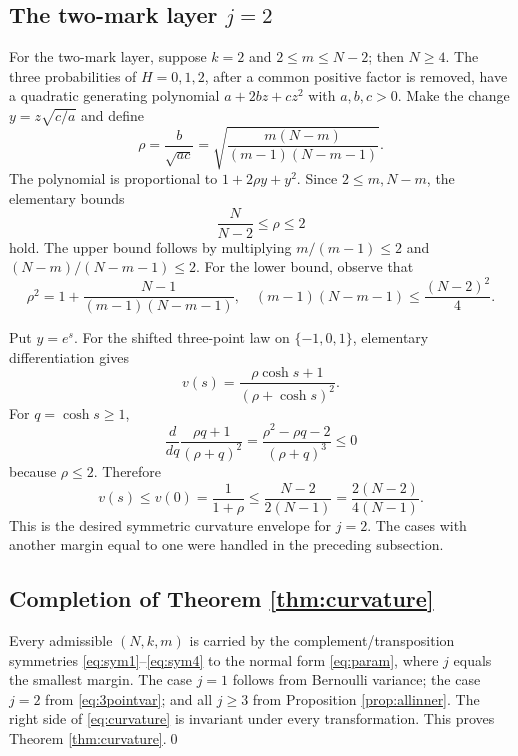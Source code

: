 \documentclass[11pt,a4paper]{article}
\begin{document}
\subsection{The two-mark layer \texorpdfstring{$j=2$}{j = 2}}
For the two-mark layer, suppose $k=2$ and $2\le m\le N-2$; then $N\ge4$. The three probabilities of $H=0,1,2$, after a common positive factor is removed, have a quadratic generating polynomial $a+2bz+cz^2$ with $a,b,c>0$. Make the change $y=z\sqrt{c/a}$ and define
\[
 \rho=\frac b{\sqrt{ac}}
 =\sqrt{\frac{m(N-m)}{(m-1)(N-m-1)}}.
\]
The polynomial is proportional to $1+2\rho y+y^2$. Since $2\le m,N-m$, the elementary bounds
\[
 \frac{N}{N-2}\le\rho\le2
\]
hold. The upper bound follows by multiplying $m/(m-1)\le2$ and $(N-m)/(N-m-1)\le2$. For the lower bound, observe that
\[
 \rho^2=1+\frac{N-1}{(m-1)(N-m-1)},
 \quad (m-1)(N-m-1)\le\frac{(N-2)^2}4.
\]

Put $y=e^s$. For the shifted three-point law on $\{-1,0,1\}$, elementary differentiation gives
\begin{equation}\label{eq:3pointvar}
 v(s)=\frac{\rho\cosh s+1}{(\rho+\cosh s)^2}.
\end{equation}
For $q=\cosh s\ge1$,
\[
 \frac{d}{dq}\frac{\rho q+1}{(\rho+q)^2}
 =\frac{\rho^2-\rho q-2}{(\rho+q)^3}\le0
\]
because $\rho\le2$. Therefore
\[
 v(s)\le v(0)=\frac1{1+\rho}
 \le\frac{N-2}{2(N-1)}=
 \frac{2(N-2)}{4(N-1)}.
\]
This is the desired symmetric curvature envelope for $j=2$. The cases with another margin equal to one were handled in the preceding subsection.

\subsection{Completion of Theorem \ref{thm:curvature}}
Every admissible $(N,k,m)$ is carried by the complement/transposition symmetries \eqref{eq:sym1}--\eqref{eq:sym4} to the normal form \eqref{eq:param}, where $j$ equals the smallest margin. The case $j=1$ follows from Bernoulli variance; the case $j=2$ from \eqref{eq:3pointvar}; and all $j\ge3$ from Proposition \ref{prop:allinner}. The right side of \eqref{eq:curvature} is invariant under every transformation. This proves Theorem \ref{thm:curvature}.\qed


\end{document}
